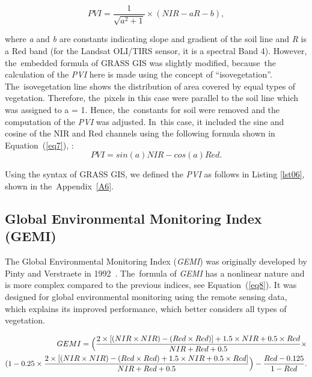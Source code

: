 \documentclass[jmse,article,accept,pdftex,moreauthors]{Definitions/mdpi}
\begin{document}
\begin{equation}\label{eq6}
	PVI=\frac{1}{\sqrt{a^2+1}} \times (NIR - aR - b),
\end{equation} 

\noindent where \emph{a} and \emph{b} are constants indicating slope and gradient of the soil line and \emph{R} is a Red band (for the Landsat OLI/TIRS sensor, it is a spectral Band 4). However, the~embedded formula of GRASS GIS was slightly modified, because~the calculation of the \emph{PVI} here is made using the concept of ``isovegetation''. The~isovegetation line shows the distribution of area covered by equal types of vegetation. Therefore, the~pixels in this case were parallel to the soil line which was assigned to a = 1. Hence, the~constants for soil were removed and the computation of the \emph{PVI} was adjusted. In~this case, it included the sine and cosine of the NIR and Red channels using the following formula shown in Equation~(\ref{eq7}), \cite{PERRY1984169}:
\begin{equation}\label{eq7}
	PVI = sin(a)NIR-cos(a)Red.
\end{equation} 

Using the syntax of GRASS GIS, we defined the \emph{PVI} as follows in Listing \ref{lst06}, shown in the~Appendix~\ref{A6}.

\subsection{Global Environmental Monitoring Index (GEMI)}

The Global Environmental Monitoring Index (\emph{GEMI}) was originally developed by Pinty and Verstraete in 1992~\cite{PintyVerstraete}. The~formula of \emph{GEMI} has a nonlinear nature and is more complex compared to the previous indices, see Equation~(\ref{eq8}). It was designed for global environmental monitoring using the remote sensing data, which explains its improved performance, which better considers all types of vegetation.

\begingroup\makeatletter{}\check@mathfonts
\def\maketag@@@#1{\hbox{\m@th\normalsize\normalfont#1}}
\begin{align}
GEMI = \Bigl( \frac{2\times[(NIR \times NIR)-(Red \times Red)] + 1.5\times NIR+0.5\times Red}{NIR + Red + 0.5} \times \nonumber\\
        (1 - 0.25 \times \frac{2 \times[(NIR \times NIR)-(Red \times Red) + 1.5 \times NIR+0.5 \times Red]}{NIR + Red + 0.5} \Bigr ) - \frac{Red - 0.125}{1 - Red}. \label{eq8}
\end{align}
\endgroup
\end{document}
